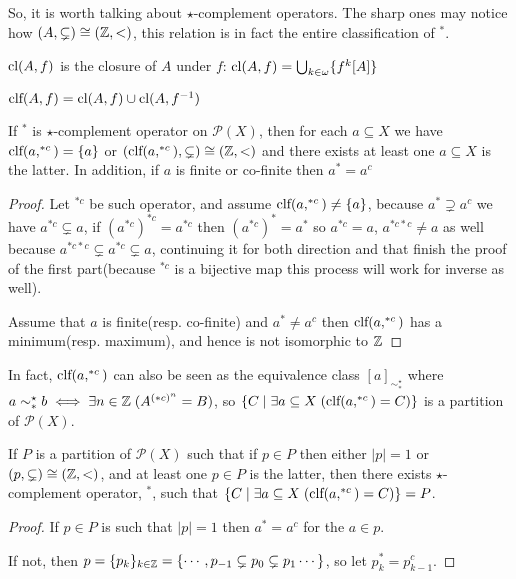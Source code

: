 	So, it is worth talking about $\star$-complement operators. The sharp ones may notice how $(A,\subsetneq)\cong(\Bbb{Z},<)$, this relation is in fact the entire classification of $^*$.
	\begin{definition}
		$\mbox{cl}(A,f)$ is the closure of $A$ under $f$: $\mbox{cl}(A,f)=\bigcup_{k\in\omega}\{f^k[A]\}$
	\end{definition}
	\begin{definition}
		$\mbox{clf}(A,f)=\mbox{cl}(A,f)\cup\mbox{cl}(A,f^{-1})$
	\end{definition}
	\begin{lemma}
		If $^{*}$ is $\star$-complement operator on $\mathcal{P}(X)$, then for each $a\subseteq X$ we have $\mbox{clf}(a,^{*c})=\{a\}$ or $(\mbox{clf}(a,^{*c}),\subsetneq)\cong(\Bbb{Z}, <)$ and there exists at least one $a\subseteq X$ is the latter. In addition, if $a$ is finite or co-finite then $a^*=a^c$
	\end{lemma}
	\begin{proof}
		Let $^{*c}$ be such operator, and assume $\mbox{clf}(a,^{*c})\ne\{a\}$, because $a^{*}\supsetneq a^c$ we have $a^{*c}\subsetneq a$, if $(a^{*c})^{*c}=a^{*c}$ then $(a^{*c})^{*}=a^{*}$ so $a^{*c}=a$, $a^{*c*c}\ne a$ as well because $a^{*c*c}\subsetneq a^{*c}\subsetneq a$, continuing it for both direction and that finish the proof of the first part(because $^{*c}$ is a bijective map this process will work for inverse as well).
		
		Assume that $a$ is finite(resp. co-finite) and $a^*\ne a^c$ then $\mbox{clf}(a,^{*c})$ has a minimum(resp. maximum), and hence is not isomorphic to $\Bbb{Z}$
	\end{proof}
	In fact, $\mbox{clf}(a,^{*c})$ can also be seen as the equivalence class $[a]_{\sim_*^\star}$ where $a\sim_*^\star b\iff \exists n\in\Bbb{Z}\;(A^{(*c)^n}=B)$, so $\{C\mid \exists a\subseteq X\;(\mbox{clf}(a,^{*c})=C)\}$ is a partition of $\mathcal{P}(X)$.
	\begin{lemma}
		If $P$ is a partition of $\mathcal{P}(X)$ such that if $p\in P$ then either $|p|=1$ or $(p,\subsetneq)\cong(\Bbb{Z},<)$, and at least one $p \in P$ is the latter, then there exists $\star$-complement operator, $^*$, such that $\{C\mid \exists a\subseteq X\;(\mbox{clf}(a,^{*c})=C)\}=P$.
	\end{lemma}
	\begin{proof}
		If $p\in P$ is such that $|p|=1$ then $a^*=a^c$ for the $a\in p$.
		
		If not, then $p=\{p_k\}_{k\in\Bbb{Z}}=\{\cdots, p_{-1}\subsetneq p_0\subsetneq p_1\cdots\}$, so let $p_k^*=p_{k-1}^c$.
	\end{proof}
	
